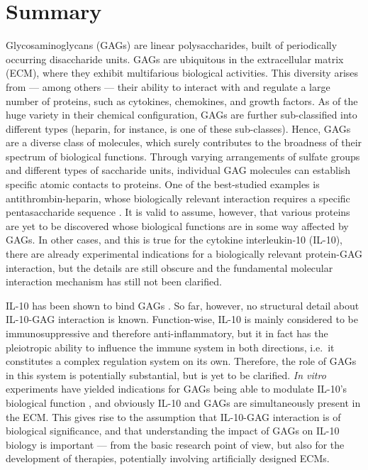 
\vspace{-1.8cm}

\chapter{Summary}



Glycosaminoglycans (GAGs) are linear polysaccharides, built of periodically
occurring disaccharide units. GAGs are ubiquitous in the extracellular matrix
(ECM), where they exhibit multifarious biological activities. This diversity
arises from --- among others --- their ability to interact with and regulate a
large number of proteins, such as cytokines, chemokines, and growth factors. As
of the huge variety in their chemical configuration, GAGs are further
sub-classified into different types (heparin, for instance, is one of these
sub-classes). Hence, GAGs are a diverse class of molecules, which surely
contributes to the broadness of their spectrum of biological functions. Through
varying arrangements of sulfate groups and different types of saccharide units,
individual GAG molecules can establish specific atomic contacts to proteins. One
of the best-studied examples is antithrombin-heparin, whose biologically
relevant interaction requires a specific pentasaccharide sequence
\cite{antithrombin-thrombin-heparin-2004}. It is valid to assume, however, that
various proteins are yet to be discovered whose biological functions are in some
way affected by GAGs. In other cases, and this is true for the cytokine
interleukin-10 (IL-10), there are already experimental indications for a
biologically relevant protein-GAG interaction, but the details are still obscure
and the fundamental molecular interaction mechanism has still not been
clarified.

IL-10 has been shown to bind GAGs \cite{salek_ardakani_2000}. So far, however,
no structural detail about IL-10-GAG interaction is known. Function-wise, IL-10
is mainly considered to be immunosuppressive and therefore anti-inflammatory,
but it in fact has the pleiotropic ability to influence the immune system in
both directions, i.e.\ it constitutes a complex regulation system on its own.
Therefore, the role of GAGs in this system is potentially substantial, but is
yet to be clarified. \textit{In vitro} experiments have yielded indications for
GAGs being able to modulate IL-10's biological function
\cite{salek_ardakani_2000}, and obviously IL-10 and GAGs are simultaneously
present in the ECM. This gives rise to the assumption that IL-10-GAG interaction
is of biological significance, and that understanding the impact of GAGs on
IL-10 biology is important --- from the basic research point of view, but also
for the development of therapies, potentially involving artificially designed
ECMs.

